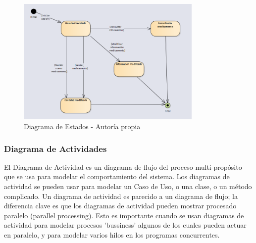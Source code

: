 \begin{center}
    \begin{figure}[htb]
        \centering
        \includegraphics[width = 0.8\textwidth] {libro/capitulo5/img/Estados.PNG}
        \caption{Diagrama de Estados - Autor\'ia propia}
        \label{fig:my_label}
    \end{figure}
\end{center}
\subsubsection{ Diagrama de Actividades}

El Diagrama de Actividad es un diagrama de flujo del proceso multi-propósito que se usa para modelar el comportamiento del sistema. Los diagramas de actividad se pueden usar para modelar un Caso de Uso, o una clase, o un método complicado.
\newline
Un diagrama de actividad es parecido a un diagrama de flujo; la diferencia clave es que los diagramas de actividad pueden mostrar procesado paralelo (parallel processing). Esto es importante cuando se usan diagramas de actividad para modelar procesos 'bussiness' algunos de los cuales pueden actuar en paralelo, y para modelar varios hilos en los programas concurrentes.

